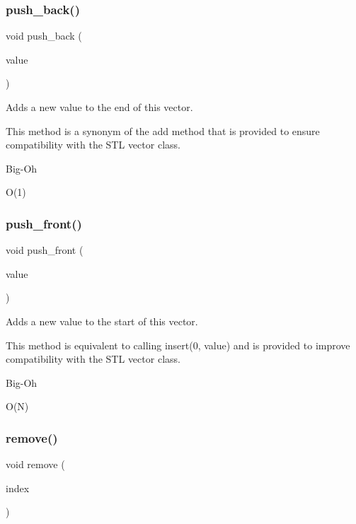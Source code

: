\subsubsection{\texorpdfstring{push\+\_\+back()}{push\_back()}}
{\footnotesize\ttfamily void push\+\_\+back (\begin{DoxyParamCaption}\item[{const Value\+Type \&}]{value }\end{DoxyParamCaption})}



Adds a new value to the end of this vector. 

This method is a synonym of the add method that is provided to ensure compatibility with the S\+TL {\ttfamily vector} class. \begin{DoxyRefDesc}{Big-\/\+Oh}
\item[\mbox{\hyperlink{BigOh__BigOh000121}{Big-\/\+Oh}}]O(1) \end{DoxyRefDesc}
\mbox{\label{classVector_a9737dc314198d1cf306325134f000c5a}} 
\subsubsection{\texorpdfstring{push\+\_\+front()}{push\_front()}}
{\footnotesize\ttfamily void push\+\_\+front (\begin{DoxyParamCaption}\item[{const Value\+Type \&}]{value }\end{DoxyParamCaption})}



Adds a new value to the start of this vector. 

This method is equivalent to calling insert(0, value) and is provided to improve compatibility with the S\+TL {\ttfamily vector} class. \begin{DoxyRefDesc}{Big-\/\+Oh}
\item[\mbox{\hyperlink{BigOh__BigOh000122}{Big-\/\+Oh}}]O(\+N) \end{DoxyRefDesc}
\mbox{\label{classVector_a2ad1aa316f278b2e9fa8121504749652}} 
\subsubsection{\texorpdfstring{remove()}{remove()}}
{\footnotesize\ttfamily void remove (\begin{DoxyParamCaption}\item[{int}]{index }\end{DoxyParamCaption})}



